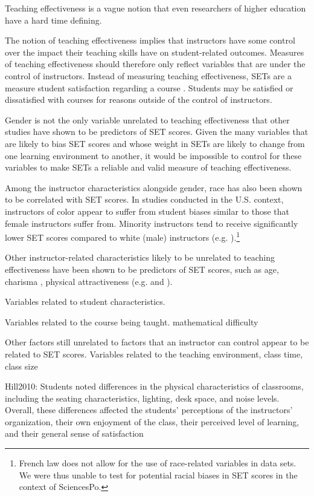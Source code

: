 \documentclass[12pt]{article}
\begin{document}
Teaching effectiveness is a vague notion that even researchers of higher education have a hard time defining. 

The notion of teaching effectiveness implies that instructors have some control over the impact their teaching skills have on student-related outcomes. Measures of teaching effectiveness should therefore only reflect variables that are under the control of instructors. Instead of measuring teaching effectiveness, SETs are a measure student satisfaction regarding a course \citep{Stark2014}. Students may be satisfied or dissatisfied with courses for reasons outside of the control of instructors.   

Gender is not the only variable unrelated to teaching effectiveness that other studies have shown to be predictors of SET scores. Given the many variables that are likely to bias SET scores and whose weight in SETs are likely to change from one learning environment to another, it would be impossible to control for these variables to make SETs a reliable and valid measure of teaching effectiveness. 

Among the instructor characteristics alongside gender, race has also been shown to be correlated with SET scores.  In studies conducted in the U.S. context, instructors of color appear to suffer from student biases similar to those that female instructors suffer from. Minority instructors tend to receive significantly lower SET scores compared to white (male) instructors (e.g. \citet{Merritt2008}).\footnote{French law does not allow for the use of race-related variables in data sets. We were thus unable to test for potential racial biases in SET scores in the context of SciencesPo.} 

Other instructor-related characteristics likely to be unrelated to teaching effectiveness have been shown to be predictors of SET scores, such as age, charisma \citep{Shevlin2000}, physical attractiveness (e.g. \citet{Riniolo2006} and \citet{Hamermesh2005}).  

Variables related to student characteristics.

Variables related to the course being taught. mathematical difficulty

Other factors still unrelated to factors that an instructor can control appear to be related to SET scores.  Variables related to the teaching environment, class time, class size

Hill2010: Students noted differences in the physical characteristics of classrooms, including the seating characteristics, lighting, desk space, and noise levels. Overall, these differences affected the students' perceptions of the instructors' organization, their own enjoyment of the class, their perceived level of learning, and their general sense of satisfaction
\end{document}
